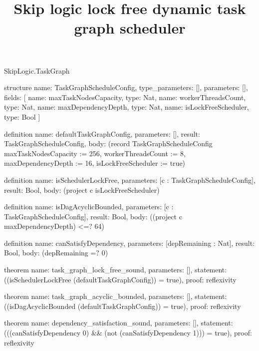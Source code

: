 \begin{lexlean}{SkipLogic.TaskGraph}
\title{Skip logic lock free dynamic task graph scheduler}
\begin{semanticmodule}
structure{
  name: TaskGraphScheduleConfig,
  type_parameters: [],
  parameters: [],
  fields: [
    {name: maxTaskNodesCapacity, type: Nat},
    {name: workerThreadsCount, type: Nat},
    {name: maxDependencyDepth, type: Nat},
    {name: isLockFreeScheduler, type: Bool}
  ]
}

definition{
  name: defaultTaskGraphConfig,
  parameters: [],
  result: TaskGraphScheduleConfig,
  body: (record TaskGraphScheduleConfig {maxTaskNodesCapacity := 256, workerThreadsCount := 8, maxDependencyDepth := 16, isLockFreeScheduler := true})
}

definition{
  name: isSchedulerLockFree,
  parameters: [c : TaskGraphScheduleConfig],
  result: Bool,
  body: (project c isLockFreeScheduler)
}

definition{
  name: isDagAcyclicBounded,
  parameters: [c : TaskGraphScheduleConfig],
  result: Bool,
  body: ((project c maxDependencyDepth) <=? 64)
}

definition{
  name: canSatisfyDependency,
  parameters: [depRemaining : Nat],
  result: Bool,
  body: (depRemaining =? 0)
}

theorem{
  name: task_graph_lock_free_sound,
  parameters: [],
  statement: ((isSchedulerLockFree (defaultTaskGraphConfig)) = true),
  proof: reflexivity{}
}

theorem{
  name: task_graph_acyclic_bounded,
  parameters: [],
  statement: ((isDagAcyclicBounded (defaultTaskGraphConfig)) = true),
  proof: reflexivity{}
}

theorem{
  name: dependency_satisfaction_sound,
  parameters: [],
  statement: (((canSatisfyDependency 0) && (not (canSatisfyDependency 1))) = true),
  proof: reflexivity{}
}
\end{semanticmodule}
\end{lexlean}
